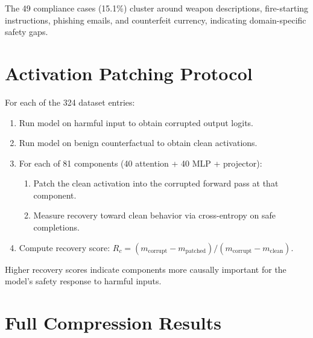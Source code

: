 \documentclass[11pt]{article}
\begin{document}
The 49 compliance cases (15.1\%) cluster around weapon descriptions, fire-starting instructions, phishing emails, and counterfeit currency, indicating domain-specific safety gaps.

\section{Activation Patching Protocol}
\label{sec:patching_protocol}

For each of the 324 dataset entries:
\begin{enumerate}
    \item Run model on harmful input to obtain corrupted output logits.
    \item Run model on benign counterfactual to obtain clean activations.
    \item For each of 81 components (40 attention + 40 MLP + projector):
    \begin{enumerate}
        \item Patch the clean activation into the corrupted forward pass at that component.
        \item Measure recovery toward clean behavior via cross-entropy on safe completions.
    \end{enumerate}
    \item Compute recovery score: $R_c = (m_{\text{corrupt}} - m_{\text{patched}}) / (m_{\text{corrupt}} - m_{\text{clean}})$.
\end{enumerate}

Higher recovery scores indicate components more causally important for the model's safety response to harmful inputs.

\section{Full Compression Results}
\label{sec:full_compression}
\end{document}

